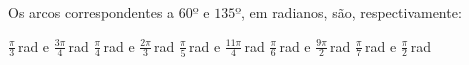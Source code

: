Os arcos correspondentes a $60º$ e $135º$, em radianos, são, respectivamente:

$\frac{\pi}{3}$\,rad e $\frac{3\pi}{4}$\,rad
$\frac{\pi}{4}$\,rad e $\frac{2\pi}{3}$\,rad
$\frac{\pi}{5}$\,rad e $\frac{11\pi}{4}$\,rad
$\frac{\pi}{6}$\,rad e $\frac{9\pi}{2}$\,rad
$\frac{\pi}{7}$\,rad e $\frac{\pi}{2}$\,rad


